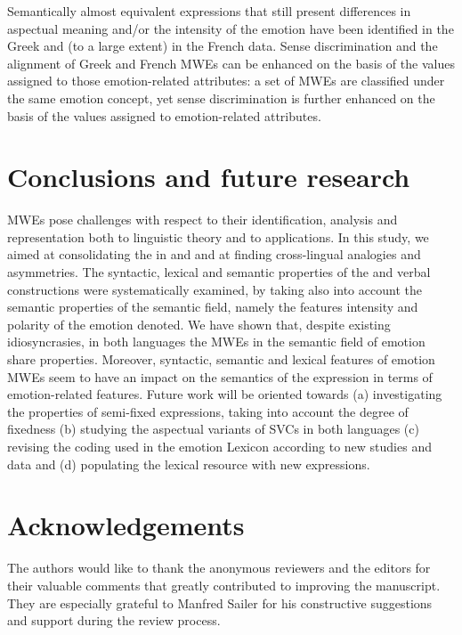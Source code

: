 \documentclass[output=paper]{langsci/langscibook}
\begin{document}
Semantically almost equivalent expressions that still
present differences in aspectual
meaning and/or the intensity of the emotion have been
identified in the Greek and (to a large extent) in the French data. Sense discrimination and the alignment of Greek and French MWEs can be
enhanced on the basis of the values assigned to those emotion-related
attributes: a set of MWEs are classified under the same
emotion concept, yet sense discrimination is further enhanced on the
basis of the values assigned to emotion-related attributes.


\section{Conclusions and future research}


MWEs pose challenges with respect to their identification, analysis and
representation  both to linguistic theory and to applications.  In this study, we aimed at
consolidating the  in  and  and at
finding cross-lingual analogies and asymmetries. The
syntactic, lexical and semantic properties of the  and  verbal
constructions were systematically examined, by taking also into account
the semantic properties of the semantic field, namely the features
intensity and polarity of the emotion denoted. We have
shown that, despite existing idiosyncrasies, in both languages the MWEs in the semantic
field of emotion share  properties. Moreover,
syntactic, semantic and lexical features of emotion MWEs seem to have
an impact on the semantics of the expression in terms of
emotion-related features. Future work will be oriented towards (a)
investigating the properties of semi-fixed expressions, taking into
account the degree of fixedness (b) studying the aspectual variants of
SVCs in both languages (c) revising the coding used in the emotion
Lexicon according to new studies and data and (d) populating the
lexical resource with new expressions.


\section*{Acknowledgements}

The authors would like to thank the anonymous reviewers and the editors
for their valuable comments that greatly contributed to improving the
manuscript. They are especially grateful to Manfred Sailer for his
constructive suggestions and support during the review process.
\end{document}
